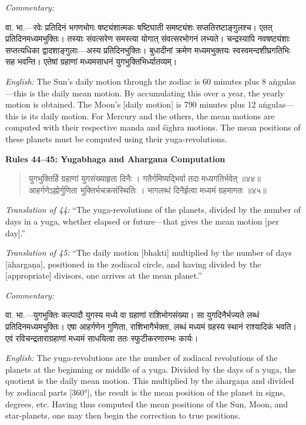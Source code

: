 \documentclass[11pt,a4paper]{book}
\newcommand{\dev}[1]{{\devanagarifont #1}}
\newenvironment{shloka}{%
  \begin{verse}
  \devanagarifont\color{versecolor}%
}{\end{verse}}
\newenvironment{vasaanaskt}{%
  \par\vspace{0.5em}\noindent\small\textit{Commentary:}%
}{\par\vspace{0.5em}}
\newcommand{\ruleheading}[1]{%
  \par\vspace{0.8em}\noindent\textbf{\color{sectioncolor}#1}\par\vspace{0.3em}%
}
\begin{document}
\begin{vasaanaskt}
\dev{वा. भा.}---रवेः प्रतिदिनं भगणभोगः षष्ट्यंशात्मकः षष्टिघाती समष्ट्यंशः सप्ततिरष्टाङ्गुलश्च। एतत् प्रतिदिनमध्यमभुक्तिः। तस्याः संवत्सरेण समस्त्या योगात् संवत्सरभोगनं लभ्यते। चन्द्रस्यापि नवषष्ट्यंशाः सप्तत्यधिका द्वादशाङ्गुलाः---अस्य प्रतिदिनभुक्तिः। बुधादीनां क्रमेण मध्यमभुक्तयः स्वस्वमन्दशीघ्रगतिभिः सह भवन्ति। एतेषां ग्रहाणां मध्यमसाधनं युगभुक्तिभिर्ध्यातव्यम्।

\textit{English:} The Sun's daily motion through the zodiac is 60 minutes plus 8 aṅgulas---this is the daily mean motion. By accumulating this over a year, the yearly motion is obtained. The Moon's [daily motion] is 790 minutes plus 12 aṅgulas---this is its daily motion. For Mercury and the others, the mean motions are computed with their respective manda and śīghra motions. The mean positions of these planets must be computed using their yuga-revolutions.
\end{vasaanaskt}

\ruleheading{Rules 44--45: Yugabhaga and Ahargana Computation}

\begin{shloka}
\begin{altverse}
\dev{युगभुक्तिर्हि ग्रहाणां युगसंख्याहृता दिनैः ।}
\dev{गतैर्गमिष्यद्भिर्वा तदा मध्यगतिर्भवेत् ॥४४॥}
\dev{आहर्गणेऽह्नोर्गुणिता भुक्तिर्भचक्रसंस्थितिः ।}
\dev{भागलब्धं दिनैर्हृत्वा मध्यमं ग्रहमागतः ॥४५॥}
\end{altverse}
\end{shloka}

\textit{Translation of 44:} ``The yuga-revolutions of the planets, divided by the number of days in a yuga, whether elapsed or future---that gives the mean motion [per day].''

\textit{Translation of 45:} ``The daily motion [bhakti] multiplied by the number of days [āhargaṇa], positioned in the zodiacal circle, and having divided by the [appropriate] divisors, one arrives at the mean planet.''

\begin{vasaanaskt}
\dev{वा. भा.}---युगभुक्तिः कल्पादौ युगस्य मध्ये वा ग्रहाणां राशिभोगसंख्या। सा युगदिनैर्भज्यते लब्धं प्रतिदिनमध्यमभुक्तिः। एषा आहर्गणेन गुणिता, राशिभागैर्भक्ता, लब्धं मध्यमं ग्रहस्य स्थानं राश्यादिकं भवति। एवं रविचन्द्रताराग्रहाणां मध्यमं साधयित्वा ततः स्फुटीकरणारम्भः कार्यः।

\textit{English:} The yuga-revolutions are the number of zodiacal revolutions of the planets at the beginning or middle of a yuga. Divided by the days of a yuga, the quotient is the daily mean motion. This multiplied by the āhargaṇa and divided by zodiacal parts [360°], the result is the mean position of the planet in signs, degrees, etc. Having thus computed the mean positions of the Sun, Moon, and star-planets, one may then begin the correction to true positions.
\end{vasaanaskt}
\end{document}
